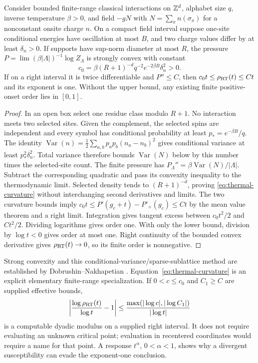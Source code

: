 \begin{proposition}
\label{prop:thermal-curvature}
Consider bounded finite-range classical interactions on $\mathbb Z^d$,
alphabet size $q$, inverse temperature $\beta>0$, and field $-gN$
with $N=\sum_xn(\sigma_x)$ for a nonconstant onsite charge $n$.
On a compact field interval suppose one-site conditional energies
have oscillation at most $B$, and two charge values differ by at
least $\delta_n>0$. If supports have sup-norm diameter at most $R$,
the pressure $P=\lim (\beta|\Lambda|)^{-1}\log Z_\Lambda$ is
strongly convex with constant
\begin{equation}\label{eq:thermal-curvature}
 c_0=\beta(R+1)^{-d}q^{-2}e^{-2\beta B}\delta_n^2>0.
\end{equation}
If on a right interval it is twice differentiable and $P''\leq C$,
then $c_0t\leq\rho_{\rm RT}(t)\leq Ct$ and its exponent is one.
Without the upper bound, any existing finite positive-onset order
lies in $[0,1]$.
\end{proposition}
\begin{proof}
In an open box select one residue class modulo $R+1$. No interaction
meets two selected sites. Given the complement, the selected spins
are independent and every symbol has conditional probability at
least $p_*=e^{-\beta B}/q$. The identity
$\operatorname{Var}(n)=\frac12\sum_{a,b}p_ap_b(n_a-n_b)^2$
gives conditional variance at least $p_*^2\delta_n^2$. Total
variance therefore bounds $\operatorname{Var}(N)$ below by this
number times the selected-site count. The finite pressure has
$P_\Lambda''=\beta\operatorname{Var}(N)/|\Lambda|$.
Subtract the corresponding quadratic and pass its convexity
inequality to the thermodynamic limit. Selected density tends to
$(R+1)^{-d}$, proving \eqref{eq:thermal-curvature} without
interchanging second derivatives and limits.
The two curvature bounds imply
$c_0t\leq P'(g_c+t)-P'_+(g_c)\leq Ct$ by the mean value
theorem and a right limit. Integration gives tangent excess between
$c_0t^2/2$ and $Ct^2/2$. Dividing logarithms gives order one.
With only the lower bound, division by $\log t<0$ gives order at
most one. Right continuity of the bounded convex derivative gives
$\rho_{\rm RT}(t)\to0$, so its finite order is nonnegative.
\end{proof}

Strong convexity and this conditional-variance/sparse-sublattice
method are established by Dobrushin--Nakhapetian
\cite{pressureConvexity}. Equation~\eqref{eq:thermal-curvature}
is an explicit elementary finite-range specialization. If
$0<c\leq c_0$ and $C_1\geq C$ are supplied effective bounds,
\[
 \left|\frac{\log\rho_{\rm RT}(t)}{\log t}-1\right|
 \leq\frac{\max(|\log c|,|\log C_1|)}{|\log t|}
\]
is a computable dyadic modulus on a supplied right interval. It does
not require evaluating an unknown critical point; evaluation in
recentered coordinates would require a name for that point.
A response $t^\alpha$, $0<\alpha<1$, shows why a divergent
susceptibility can evade the exponent-one conclusion.

